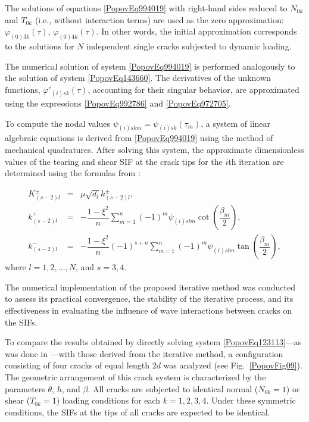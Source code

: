 The solutions of equations \eqref{PopovEq994019} with right-hand sides reduced to $N_{0k}$ and $T_{0k}$ (i.e., without interaction terms) are used as the zero approximation: \(\varphi_{(0)3k}(\tau)\), \(\varphi_{(0)4k}(\tau)\). In other words, the initial approximation corresponds to the solutions for \(N\) independent single cracks subjected to dynamic loading.

The numerical solution of system \eqref{PopovEq994019} is performed analogously to the solution of system \eqref{PopovEq143660}. The derivatives of the unknown functions, \(\varphi'_{(i)sk}(\tau)\), accounting for their singular behavior, are approximated using the expressions \eqref{PopovEq992786} and \eqref{PopovEq972705}. 

To compute the nodal values \(\psi_{(i)skm} = \psi_{(i)sk}(\tau_m)\), a system of linear algebraic equations is derived from \eqref{PopovEq994019} using the method of mechanical quadratures. After solving this system, the approximate dimensionless values of the tearing and shear SIF at the crack tips for the \(i\)th iteration are determined using the formulas from \cite{Popov14}:

\begin{equation} \label{PopovEq244046}
	\begin{array}{rcl}
		K^{\pm}_{(s-2)l} &=& \mu \sqrt{d_l}  k^{\pm}_{(s-2)l}, 
		\\[0.5em]
		k^{+}_{(s-2)l} &=& -\dfrac{1 - \xi^2}{n} \displaystyle\sum_{m=1}^{n} (-1)^m \psi_{(i)slm} \cot\left( \dfrac{\beta_m}{2} \right),
		\\[0.5em]
		k^{-}_{(s-2)l} &=& -\dfrac{1 - \xi^2}{n} (-1)^{s+n} \displaystyle\sum_{m=1}^{n} (-1)^m \psi_{(i)slm} \tan\left( \dfrac{\beta_m}{2} \right),
	\end{array}
\end{equation}
where \( l = 1, 2, \dots, N \), and \( s = 3, 4 \).

The numerical implementation of the proposed iterative method was conducted to assess its practical convergence, the stability of the iterative process, and its effectiveness in evaluating the influence of wave interactions between cracks on the SIFs. 

To compare the results obtained by directly solving system \eqref{PopovEq123113}—as was done in \cite{Popov14}—with those derived from the iterative method, a configuration consisting of four cracks of equal length \(2d\) was analyzed (see Fig.~\ref{PopovFig09}). The geometric arrangement of this crack system is characterized by the parameters \(\theta\), \(h\), and \(\beta\). All cracks are subjected to identical normal (\(N_{0k} = 1\)) or shear (\(T_{0k} = 1\)) loading conditions for each \(k=1,2,3,4\). Under these symmetric conditions, the SIFs at the tips of all cracks are expected to be identical.

